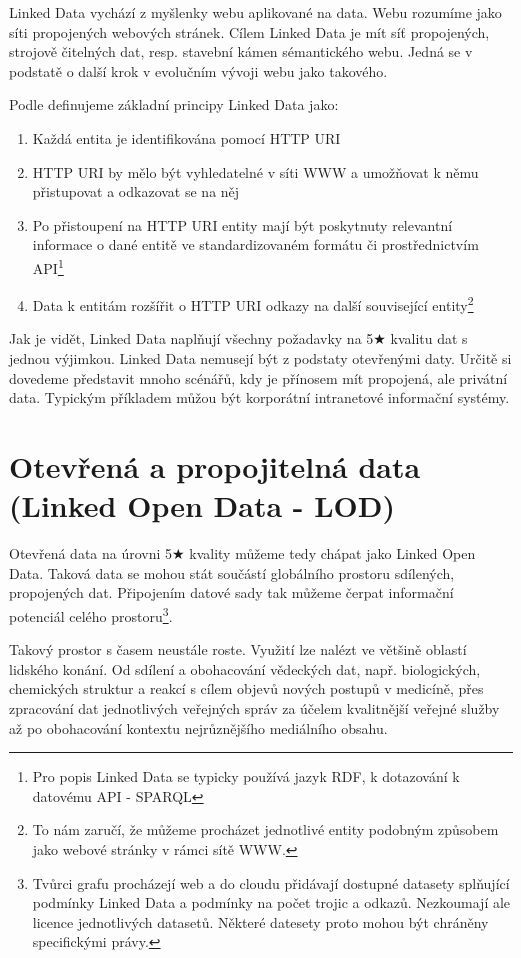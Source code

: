 Linked Data vychází z myšlenky webu aplikované na data. Webu rozumíme jako síti propojených webových stránek. Cílem Linked Data je mít síť propojených, strojově čitelných dat, resp. stavební kámen sémantického webu\cite{sw}. Jedná se v podstatě o další krok v evolučním vývoji webu jako takového.

Podle \cite{linkedData} definujeme základní principy Linked Data jako:

\begin{enumerate}
\item Každá entita je identifikována pomocí HTTP URI    
\item HTTP URI by mělo být vyhledatelné v síti WWW a umožňovat k němu přistupovat a odkazovat se na něj
\item Po přistoupení na HTTP URI entity mají být poskytnuty relevantní informace o dané entitě ve standardizovaném formátu či prostřednictvím API\footnote{Pro popis Linked Data se typicky používá jazyk RDF\cite{RdfConcepts}, k dotazování k datovému API - SPARQL\cite{Sparql}}
\item Data k entitám rozšířit o HTTP URI odkazy na další související entity\footnote{To nám zaručí, že můžeme procházet jednotlivé entity podobným způsobem jako webové stránky v rámci sítě WWW.}
\end{enumerate}

Jak je vidět, Linked Data naplňují všechny požadavky na 5$\bigstar$ kvalitu dat s jednou výjimkou. Linked Data nemusejí být z podstaty otevřenými daty. Určitě si dovedeme představit mnoho scénářů, kdy je přínosem mít propojená, ale privátní data. Typickým příkladem můžou být korporátní intranetové informační systémy.

\section{Otevřená a propojitelná data (Linked Open Data - LOD)}

Otevřená data na úrovni 5$\bigstar$ kvality můžeme tedy chápat jako Linked Open Data. Taková data se mohou stát součástí globálního prostoru sdílených, propojených dat. Připojením datové sady tak můžeme čerpat informační potenciál celého prostoru\footnote{Tvůrci grafu procházejí web a do cloudu přidávají dostupné datasety splňující podmínky Linked Data a podmínky na počet trojic a odkazů. Nezkoumají ale licence jednotlivých datasetů. Některé datesety proto mohou být chráněny specifickými právy.}.

Takový prostor s časem neustále roste. Využití lze nalézt ve většině oblastí lidského konání. Od sdílení a obohacování vědeckých dat, např. biologických, chemických struktur a reakcí s cílem objevů nových postupů v medicíně, přes zpracování dat jednotlivých veřejných správ za účelem kvalitnější veřejné služby až po obohacování kontextu nejrůznějšího mediálního obsahu. 

